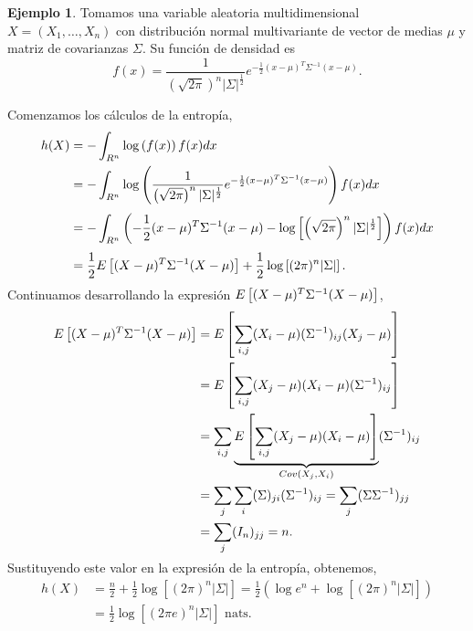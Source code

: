 \documentclass[12pt,a4paper]{report} %
\let\mathbb\relax
\theoremstyle{definition}
\newtheorem{example}[theorem]{Ejemplo}
\begin{document}
\begin{example}\label{ej:norm_multi}
  Tomamos una variable aleatoria multidimensional $X = (X_1,\dots,X_n)$ con distribución normal multivariante de vector de medias $\mu$ y matriz de covarianzas $\Sigma$. Su función de densidad es \[f(x) = \frac{1}{\left (\sqrt{2\pi}\right )^n |\Sigma|^{\frac{1}{2}}} e^{-\frac{1}{2}(x-\mu)^T\Sigma^{-1}(x-\mu)}.\]
    
    Comenzamos los cálculos de la entropía,
  \begin{align*}
    h(X) &= - \int_{\mathbb{R}^n} \log\left( f(x)\right)f(x) dx \\
    &= - \int_{\mathbb{R}^n} \log \left ( \frac{1}{\left ( \sqrt{2\pi} \right )^n |\Sigma|^{\frac{1}{2}}} e^{-\frac{1}{2}(x-\mu)^T\Sigma^{-1}(x-\mu)} \right )f(x) dx\\[3pt]
    &= - \int_{\mathbb{R}^n}\left (- \frac{1}{2}(x-\mu)^T\Sigma^{-1}(x-\mu) - \log\left [ \left (\sqrt{2\pi} \right )^n |\Sigma|^{\frac{1}{2}} \right ]  \right ) f(x) dx\\[3pt]
    &= \frac{1}{2} \mathbb{E}\left [ (X-\mu)^T\Sigma^{-1}(X-\mu) \right ] + \frac{1}{2}\log\left [(2\pi)^n|\Sigma|\right ].\\[-5pt]
  \end{align*}

  Continuamos desarrollando la expresión $\mathbb{E}\left [ (X-\mu)^T\Sigma^{-1}(X-\mu) \right ]$,
  \begin{align*}
    \mathbb{E}\left [ (X-\mu)^T\Sigma^{-1}(X-\mu) \right ] &= \mathbb{E}\left [ \sum_{i,j}(X_i - \mu)(\Sigma^{-1})_{ij}(X_j-\mu)\right ]\\
    &= \mathbb{E}\left[ \sum_{i,j}(X_j-\mu)(X_i-\mu)(\Sigma^{-1})_{ij}\right]\\
    &= \sum_{i,j}\underbrace{\mathbb{E}\left[ \sum_{i,j}(X_j-\mu)(X_i-\mu)\right]}_{Cov(X_j,X_i)}(\Sigma^{-1})_{ij}\\
    &= \sum_j\sum_i(\Sigma)_{ji}(\Sigma^{-1})_{ij} = \sum_j (\Sigma\Sigma^{-1})_{jj}\\ &= \sum_j (I_n)_{jj} = n.\\[-7pt]
  \end{align*}

  Sustituyendo este valor en la expresión de la entropía, obtenemos,
  \begin{align*}
    h(X) &= \frac{n}{2} + \frac{1}{2}\log\left [ (2\pi)^n|\Sigma|\right ] = \frac{1}{2} \left (\log e^n + \log \left[(2\pi)^n|\Sigma|\right] \right)\\[3pt]
    &= \frac{1}{2}\log\left[(2\pi e)^n|\Sigma|\right] \text{ nats.}\\
  \end{align*}

  
\end{example}
\end{document}
